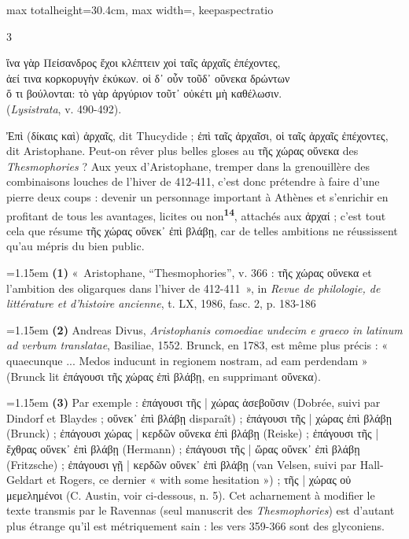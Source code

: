 \documentclass[11pt,twoside]{book}
\newcommand{\italique}[1]{\textit{#1}}
\newcommand{\citComm}[1]{\begin{quoting}[vskip=0.4pt,leftmargin=0.7em,rightmargin=0.2em]#1\end{quoting}}
\newcommand{\marqueur}[1]{\textsuperscript{\color{rubricRed}\textbf{#1}}}
\begin{document}
\begin{adjustbox}{max totalheight=30.4cm, max width=\textwidth, keepaspectratio}
\begin{minipage}{\textwidth}
{\begin{multicols}{3}
\citComm{ἵνα γὰρ Πείσανδρος ἔχοι κλέπτειν χοἰ ταῖς ἀρχαῖς ἐπέχοντες,\\
ἀεί τινα κορκορυγὴν ἐκύκων. οἱ δ᾽ οὖν τοῦδ᾽ οὕνεκα δρώντων\\
ὅ τι βούλονται: τὸ γὰρ ἀργύριον τοῦτ᾽ οὐκέτι μὴ καθέλωσιν.\\
(\italique{Lysistrata}, v. 490-492).}
\par\vspace{1.5pt}
\noindent Ἐπὶ (δίκαις καὶ) ἀρχαῖς, dit Thucydide ; ἐπὶ ταῖς ἀρχαῖσι, οἱ ταῖς ἀρχαῖς ἐπέχοντες, dit Aristophane. Peut-on rêver plus belles gloses au τῆς χώρας οὕνεκα des \italique{Thesmophories} ? Aux yeux d'Aristophane, tremper dans la grenouillère des combinaisons louches de l'hiver de 412-411, c'est donc prétendre à faire d'une pierre deux coups : devenir un personnage important à Athènes et s'enrichir en profitant de tous les avantages, licites ou non\marqueur{14}, attachés aux ἀρχαί ; c'est tout cela que résume τῆς χώρας οὕνεκ᾽ ἐπὶ βλάβῃ, car de telles ambitions ne réussissent qu'au mépris du bien public.
\par\vspace{1.5pt}
\noindent\hangindent=1.15em {\color{sepiaNote}\textbf{(1)}} «~Aristophane, ``Thesmophories'', v. 366 : τῆς χώρας οὕνεκα et l'ambition des oligarques dans l'hiver de 412-411~», in \italique{Revue de philologie, de littérature et d'histoire ancienne}, t. LX, 1986, fasc. 2, p. 183-186
\par\vspace{1.5pt}
\noindent\hangindent=1.15em {\color{sepiaNote}\textbf{(2)}} Andreas Divus, \italique{Aristophanis comoediae undecim e graeco in latinum ad verbum translatae}, Basiliae, 1552. Brunck, en 1783, est même plus précis : « quaecunque ... Medos inducunt in regionem nostram, ad eam perdendam » (Brunck lit ἐπάγουσι τῆς χώρας ἐπὶ βλάβῃ, en supprimant οὕνεκα).
\par\vspace{1.5pt}
\noindent\hangindent=1.15em {\color{sepiaNote}\textbf{(3)}} Par exemple : ἐπάγουσι τῆς | χώρας ἀσεβοῦσιν (Dobrée, suivi par Dindorf et Blaydes ; οὕνεκ᾽ ἐπὶ βλάβῃ disparaît) ; ἐπάγουσι τῆς | χώρας ἐπὶ βλάβῃ (Brunck) ; ἐπάγουσι χώρας | κερδῶν οὕνεκα ἐπὶ βλάβῃ (Reiske) ; ἐπάγουσι τῆς | ἔχθρας οὕνεκ᾽ ἐπὶ βλάβῃ (Hermann) ; ἐπάγουσι τῆς | ὥρας οὕνεκ᾽ ἐπὶ βλάβῃ (Fritzsche) ; ἐπάγουσι γῇ | κερδῶν οὕνεκ᾽ ἐπὶ βλάβῃ (van Velsen, suivi par Hall-Geldart et Rogers, ce dernier « with some hesitation ») ; τῆς | χώρας οὐ μεμελημένοι (C. Austin, voir ci-dessous, n. 5). Cet acharnement à modifier le texte transmis par le Ravennas (seul manuscrit des \italique{Thesmophories}) est d'autant plus étrange qu'il est métriquement sain : les vers 359-366 sont des glyconiens.

\end{multicols}}
\end{minipage}
\end{adjustbox}
\end{document}
